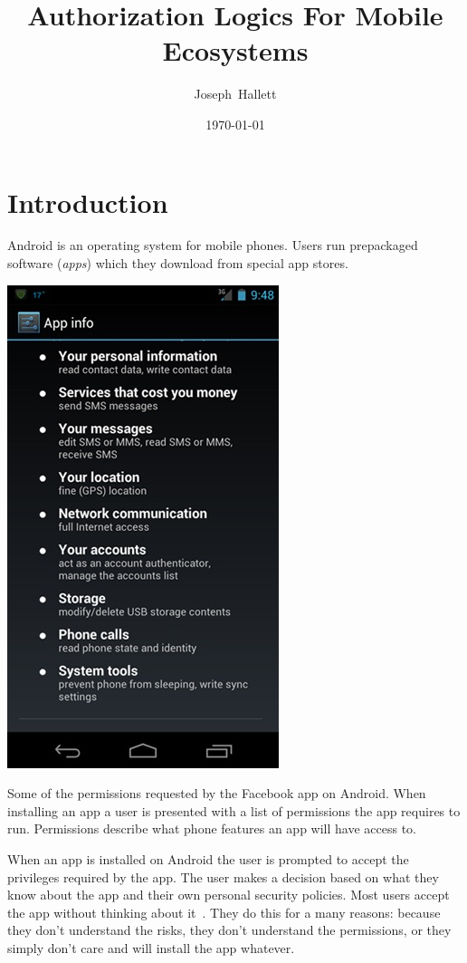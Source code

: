 \documentclass[a4paper]{article}
\title{Authorization Logics For Mobile Ecosystems}%
\author{Joseph~Hallett}
\date\today
\begin{document}
\maketitle
\setcounter{tocdepth}{3}
\tableofcontents
\pagebreak

\section{Introduction}

Android is an operating system for mobile phones.  Users run prepackaged
software (\emph{apps}) which they download from special app stores.

\begin{marginfigure}
  \includegraphics[width=\marginlength]{img/facebookperms.jpeg}
  \caption{Some of the permissions requested by the Facebook app on Android.
  When installing an app a user is presented with a list of permissions the app
requires to run.  Permissions describe what phone features an app will have
access to.}
  \label{fig:fb}
\end{marginfigure}

When an app is installed on Android the user is prompted to accept the
privileges required by the app.  The user makes a decision based on what they
know about the app and their own personal security policies.  Most users accept
the app without thinking about it~\cite{Felt:2012hm}.  They do this for a many
reasons: because they don't understand the risks, they don't understand the
permissions, or they simply don't care and will install the app whatever.
\end{document}
